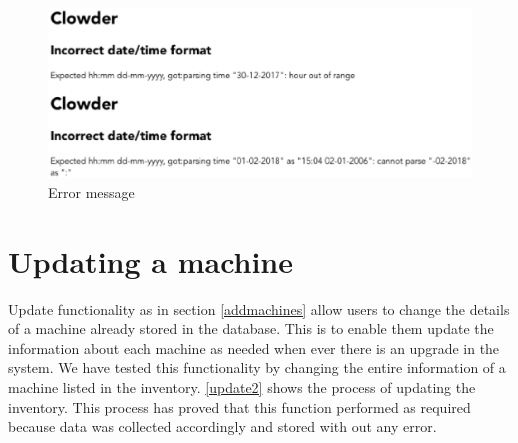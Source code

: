 \begin{figure}
\includegraphics[width=\linewidth]{dateformat2.eps}
\caption{Error message}
\label{error}
\end{figure}

\pagebreak
\section*{Updating a machine}
Update functionality as in section \ref{addmachines} allow users to change the details of a machine already stored in the database. This is to enable them update the information about each machine as needed when ever there is an upgrade in the system. We have tested this functionality by changing the entire information of a machine listed in the inventory. \autoref{update2} shows the process of updating the inventory. This process has proved that this function performed as required because data was collected accordingly and stored with out any error.

